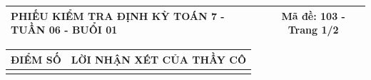 \documentclass[12pt,a4paper]{article}
\begin{document}
\newpage

\noindent
\begin{tabularx}{\linewidth}{|X|c|}
\hline
\textbf{PHIẾU KIỂM TRA ĐỊNH KỲ TOÁN 7 - TUẦN 06 - BUỔI 01} & \textbf{Mã đề: 103 - Trang 1/2} \\
\hline
\end{tabularx}

\vspace{1.0mm}

\noindent
\begin{tabularx}{\linewidth}{|p{3.2cm}|X|}
\hline
\centering\textbf{ĐIỂM SỐ} & \centering\textbf{LỜI NHẬN XÉT CỦA THẦY CÔ} \tabularnewline
\hline
\rule{0pt}{1.8cm} & \tabularnewline
\hline
\end{tabularx}
\end{document}
